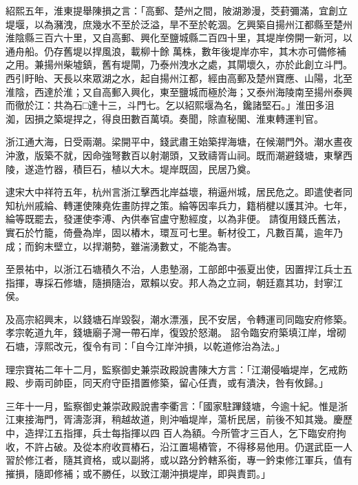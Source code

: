 \begin{pinyinscope}
 紹熙五年，淮東提舉陳損之言：「高郵、楚州之間，陂湖渺漫，茭葑彌滿，宜創立堤堰，以為瀦洩，庶幾水不至於泛溢，旱不至於乾涸。乞興築自揚州江都縣至楚州淮陰縣三百六十里，又自高郵、興化至鹽城縣二百四十里，其堤岸傍開一新河，以通舟船。仍存舊堤以捍風浪，載柳十餘
 萬株，數年後堤岸亦牢，其木亦可備修補之用。兼揚州柴墟鎮，舊有堤閘，乃泰州洩水之處，其閘壞久，亦於此創立斗門。西引盱眙、天長以來眾湖之水，起自揚州江都，經由高郵及楚州寶應、山陽，北至淮陰，西達於淮；又自高郵入興化，東至鹽城而極於海；又泰州海陵南至揚州泰興而徹於江：共為石□達十三，斗門七。乞以紹熙堰為名，鑱諸堅石。」淮田多沮洳，因損之築堤捍之，得良田數百萬頃。奏聞，除直秘閣、淮東轉運判官。



 浙江通大海，日受兩潮。梁開平中，錢武肅王始築捍海塘，在候潮門外。潮水晝夜沖激，版築不就，因命強弩數百以射潮頭，又致禱胥山祠。既而潮避錢塘，東擊西陵，遂造竹器，積巨石，植以大木。堤岸既固，民居乃奠。



 逮宋大中祥符五年，杭州言浙江擊西北岸益壞，稍逼州城，居民危之。即遣使者同知杭州戚綸、轉運使陳堯佐畫防捍之策。綸等因率兵力，籍梢楗以護其沖。七年，綸等既罷去，發運使李溥、內供奉官盧守懃經度，以為非便。
 請復用錢氏舊法，實石於竹籠，倚疊為岸，固以樁木，環亙可七里。斬材役工，凡數百萬，逾年乃成；而鉤末壁立，以捍潮勢，雖湍湧數丈，不能為害。



 至景祐中，以浙江石塘積久不治，人患墊溺，工部郎中張夏出使，因置捍江兵士五指揮，專採石修塘，隨損隨治，眾賴以安。邦人為之立祠，朝廷嘉其功，封寧江侯。



 及高宗紹興末，以錢塘石岸毀裂，潮水漂漲，民不安居，令轉運司同臨安府修築。孝宗乾道九年，錢塘廟子灣一帶石岸，復毀於怒潮。
 詔令臨安府築填江岸，增砌石塘，淳熙改元，復令有司：「自今江岸沖損，以乾道修治為法。」



 理宗寶祐二年十二月，監察御史兼崇政殿說書陳大方言：「江潮侵嚙堤岸，乞戒飭殿、步兩司帥臣，同天府守臣措置修築，留心任責，或有潰決，咎有攸歸。」



 三年十一月，監察御史兼崇政殿說書李衢言：「國家駐蹕錢塘，今逾十紀。惟是浙江東接海門，胥濤澎湃，稍越故道，則沖嚙堤岸，蕩析民居，前後不知其幾。慶歷中，造捍江五指揮，兵士每指揮以四
 百人為額。今所管才三百人，乞下臨安府拘收，不許占破。及從本府收買樁石，沿江置場樁管，不得移易他用。仍選武臣一人習於修江者，隨其資格，或以副將，或以路分鈐轄系銜，專一鈐束修江軍兵，值有摧損，隨即修補；或不勝任，以致江潮沖損堤岸，即與責罰。」




\end{pinyinscope}
